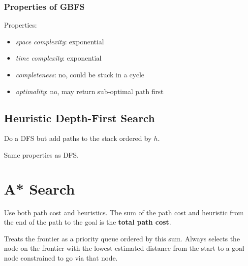 \documentclass[11pt]{article}
\begin{document}
\subsubsection{Properties of GBFS}
\label{sec:orgc5c6689}
Properties:
\begin{itemize}
\item \emph{space complexity}: exponential
\item \emph{time complexity}: exponential
\item \emph{completeness}: no, could be stuck in a cycle
\item \emph{optimality}: no, may return sub-optimal path first
\end{itemize}
\subsection{Heuristic Depth-First Search}
\label{sec:org8c8c8e4}
Do a DFS but add paths to the stack ordered by \(h\).

Same properties as DFS.
\section{A* Search}
\label{sec:orgdb09d56}
Use both path cost and heuristics.
The sum of the path cost and heuristic from the end of the path to the goal is the \textbf{total path cost}.

Treats the frontier as a priority queue ordered by this sum.
Always selects the node on the frontier with the lowest estimated distance from the start to a goal node
constrained to go via that node.
\end{document}
